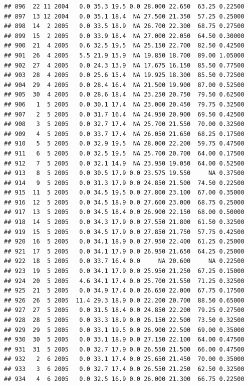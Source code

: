 \documentclass[
]{book}
\begin{document}
\begin{verbatim}
## 896  22 11 2004   0.0 35.3 19.5 0.0 28.000 22.650  63.25 0.22500
## 897  13 12 2004   0.0 35.1 18.4  NA 27.500 21.350  57.25 0.25000
## 898  14  2 2005   0.0 33.5 18.9  NA 26.700 22.300  68.75 0.27500
## 899  15  2 2005   0.0 33.9 18.4  NA 27.000 22.050  64.50 0.30000
## 900  21  4 2005   0.6 32.5 19.5  NA 25.150 22.700  82.50 0.42500
## 901  26  4 2005   5.5 21.9 15.9  NA 19.850 18.700  89.00 1.05000
## 902  27  4 2005   0.0 24.3 13.9  NA 17.675 16.150  85.50 0.77500
## 903  28  4 2005   0.0 25.6 15.4  NA 19.925 18.300  85.50 0.72500
## 904  29  4 2005   0.0 28.4 16.4  NA 21.500 19.900  87.00 0.52500
## 905  30  4 2005   0.0 28.6 18.4  NA 23.250 20.750  79.50 0.62500
## 906   1  5 2005   0.0 30.1 17.4  NA 23.000 20.450  79.75 0.32500
## 907   2  5 2005   0.0 31.7 16.4  NA 24.950 20.900  69.50 0.42500
## 908   3  5 2005   0.0 32.7 17.4  NA 25.700 21.550  70.00 0.32500
## 909   4  5 2005   0.0 33.7 17.4  NA 26.050 21.650  68.25 0.17500
## 910   5  5 2005   0.0 32.9 19.5  NA 28.000 22.200  59.75 0.47500
## 911   6  5 2005   0.0 32.5 19.5  NA 25.700 20.700  64.00 0.17500
## 912   7  5 2005   0.0 32.1 14.9  NA 23.950 19.050  64.00 0.52500
## 913   8  5 2005   0.0 30.5 17.9 0.0 23.575 19.550     NA 0.37500
## 914   9  5 2005   0.0 31.3 17.9 0.0 24.850 21.500  74.50 0.22500
## 915  11  5 2005   0.0 34.5 19.5 0.0 27.800 23.100  67.00 0.35000
## 916  12  5 2005   0.0 34.5 18.9 0.0 27.600 23.000  68.75 0.25000
## 917  13  5 2005   0.0 34.5 18.4 0.0 26.900 22.150  68.00 0.50000
## 918  14  5 2005   0.0 34.3 17.9 0.0 27.550 21.800  61.50 0.32500
## 919  15  5 2005   0.0 34.5 17.9 0.0 27.850 21.750  57.75 0.42500
## 920  16  5 2005   0.0 34.1 18.9 0.0 27.950 22.400  61.25 0.25000
## 921  17  5 2005   0.0 34.1 17.9 0.0 26.950 21.650  64.25 0.25000
## 922  18  5 2005   0.0 33.7 16.4 0.0     NA 20.600     NA 0.22500
## 923  19  5 2005   0.0 34.1 17.9 0.0 25.950 21.250  67.25 0.15000
## 924  20  5 2005   4.6 34.1 17.4 0.0 25.700 21.550  71.25 0.32500
## 925  21  5 2005   0.0 34.9 17.4 0.0 26.650 22.000  67.75 0.17500
## 926  26  5 2005  11.4 29.3 18.9 0.0 22.200 20.700  88.50 0.65000
## 927  27  5 2005   0.0 31.5 18.4 0.0 24.850 22.200  79.25 0.27500
## 928  28  5 2005   0.0 33.3 18.9 0.0 26.150 22.500  73.50 0.32500
## 929  29  5 2005   0.0 33.1 19.5 0.0 26.900 22.500  69.00 0.35000
## 930  30  5 2005   0.0 33.1 18.9 0.0 27.150 22.100  64.00 0.47500
## 931  31  5 2005   0.0 32.7 17.9 0.0 26.550 21.500  66.00 0.47500
## 932   2  6 2005   0.0 33.1 17.4 0.0 25.650 21.450  70.00 0.35000
## 933   3  6 2005   0.0 32.7 17.4 0.0 26.550 21.250  62.50 0.32500
## 934   4  6 2005   0.0 32.5 16.9 0.0 26.000 21.300  66.75 0.22500

\end{verbatim}
\end{document}
